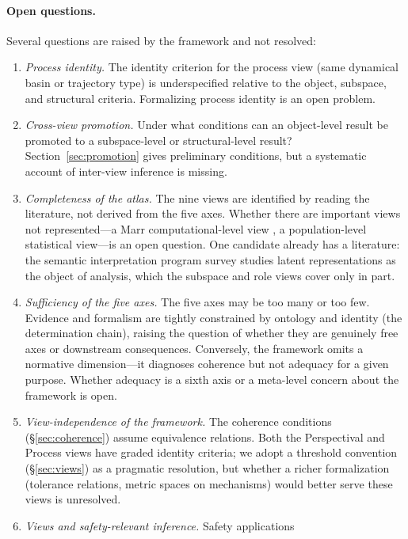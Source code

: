 \documentclass{article}
\begin{document}
\paragraph{Open questions.}
Several questions are raised by the framework and not resolved:
\begin{enumerate}[leftmargin=*]
\item \emph{Process identity.}  The identity criterion for the process
      view (same dynamical basin or trajectory type) is underspecified
      relative to the object, subspace, and structural criteria.
      Formalizing process identity is an open problem.
\item \emph{Cross-view promotion.}  Under what conditions can an
      object-level result be promoted to a subspace-level or structural-level
      result?  Section~\ref{sec:promotion} gives preliminary conditions, but
      a systematic account of inter-view inference is missing.
\item \emph{Completeness of the atlas.}  The nine views are identified
      by reading the literature, not derived from the five axes.  Whether
      there are important views not represented---a Marr computational-level
      view \citep{marr1982}, a population-level statistical view---is an open
      question.  One candidate already has a literature: the semantic
      interpretation program \citet{davies2024} survey studies latent
      representations as the object of analysis, which the subspace and role
      views cover only in part.
\item \emph{Sufficiency of the five axes.}  The five axes may be too many
      or too few.  Evidence and formalism are tightly constrained by
      ontology and identity (the determination chain), raising the question
      of whether they are genuinely free axes or downstream consequences.
      Conversely, the framework omits a normative dimension---it diagnoses
      coherence but not adequacy for a given purpose.  Whether adequacy
      is a sixth axis or a meta-level concern about the framework is open.
\item \emph{View-independence of the framework.}  The coherence
      conditions (\S\ref{sec:coherence}) assume equivalence
      relations.  Both the Perspectival and Process views have graded
      identity criteria; we adopt a threshold convention
      (\S\ref{sec:views}) as a pragmatic resolution, but whether a
      richer formalization (tolerance relations, metric spaces on
      mechanisms) would better serve these views is unresolved.
\item \emph{Views and safety-relevant inference.}  Safety applications

\end{enumerate}
\end{document}
